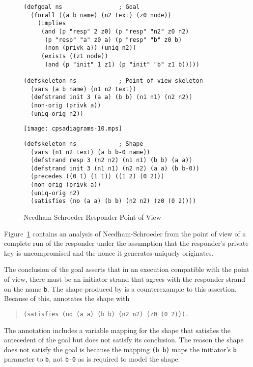 \documentclass[12pt]{article}
\begin{document}
\begin{figure}
\begin{verbatim}
(defgoal ns                ; Goal
  (forall ((a b name) (n2 text) (z0 node))
    (implies
     (and (p "resp" 2 z0) (p "resp" "n2" z0 n2)
      (p "resp" "a" z0 a) (p "resp" "b" z0 b)
      (non (privk a)) (uniq n2))
     (exists ((z1 node))
      (and (p "init" 1 z1) (p "init" "b" z1 b)))))

(defskeleton ns            ; Point of view skeleton
  (vars (a b name) (n1 n2 text))
  (defstrand init 3 (a a) (b b) (n1 n1) (n2 n2))
  (non-orig (privk a))
  (uniq-orig n2))
\end{verbatim}
\begin{center}
\texttt{[image: cpsadiagrams-10.mps]}
\end{center}
\begin{verbatim}
(defskeleton ns            ; Shape
  (vars (n1 n2 text) (a b b-0 name))
  (defstrand resp 3 (n2 n2) (n1 n1) (b b) (a a))
  (defstrand init 3 (n1 n1) (n2 n2) (a a) (b b-0))
  (precedes ((0 1) (1 1)) ((1 2) (0 2)))
  (non-orig (privk a))
  (uniq-orig n2)
  (satisfies (no (a a) (b b) (n2 n2) (z0 (0 2))))
\end{verbatim}
\caption{Needham-Schroeder Responder Point of View}
\label{fig:ns resp}
\end{figure}

Figure~\ref{fig:ns resp} contains an analysis of Needham-Schroeder
from the point of view of a complete run of the responder under the
assumption that the responder's private key is uncompromised and the
nonce it generates uniquely originates.

The conclusion of the goal asserts that in an execution compatible
with the point of view, there must be an initiator strand that agrees
with the responder strand on the name \texttt{b}.  The shape produced
by {\cpsa} is a counterexample to this assertion.  Because of this,
{\cpsa} annotates the shape with
\begin{quote}
\begin{verbatim}
(satisfies (no (a a) (b b) (n2 n2) (z0 (0 2))).
\end{verbatim}
\end{quote}
The annotation includes a variable mapping for the shape that
satisfies the antecedent of the goal but does not satisfy its
conclusion.  The reason the shape does not satisfy the goal is because
the mapping \texttt{(b b)} maps the initiator's \texttt{b} parameter
to \texttt{b}, not \texttt{b-0} as is required to model the shape.
\end{document}
